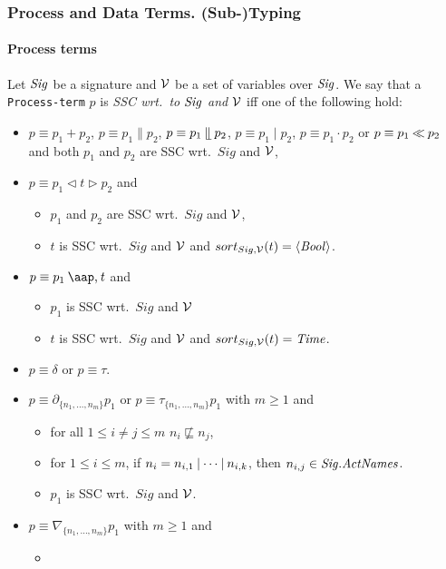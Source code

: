 \documentclass[fleqn,a4paper]{article}
\newcommand{\Sig}{\nm{Sig}}
\newcommand{\NV}{{\cal V}}
\begin{document}
\subsubsection{Process and Data Terms. (Sub-)Typing}

\paragraph{Process terms}
Let $\Sig$ be a signature and $\NV$ be a set of variables over $\Sig$.
We say that a {\tt Process-term} $p$ is {\it SSC wrt.\ to $\Sig$ and
$\NV$} iff one of the following hold:
\begin{itemize}
\item
  $p\equiv p_1+p_2$,
  $p\equiv p_1\parallel p_2$, $p\equiv p_1\mathbin{\mathrel{\llfloor}} p_2$, $p\equiv p_1\mid
  p_2$,
  $p\equiv p_1 {\cdot} p_2$ or $p\equiv p_1\mathbin{\ll} p_2$ and both $p_1$ and $p_2$ are SSC wrt.\ $Sig$ and $\NV$,
\item
  $p\equiv p_1\triangleleft t \triangleright p_2$ and
  \begin{itemize}
  \item
    $p_1$ and $p_2$ are SSC wrt.\ $Sig$ and $\NV$,
  \item
    $t$ is SSC wrt.\ $Sig$ and $\NV$ and $sort_{Sig,\NV}(t)=\seq{\Bool}$.
  \end{itemize}
\item
  $p\equiv p_1\at{t}$ and
  \begin{itemize}
\item
  $p_1$ is SSC wrt.\ $Sig$ and $\NV$
\item
  $t$ is SSC wrt.\ $Sig$ and $\NV$ and $sort_{Sig,\NV}(t)=\Time$.
\end{itemize}
\item
  $p\equiv \delta$ or $p\equiv\tau$.
\item
  $p\equiv\partial_{\{n_1,\ldots,n_m\}}p_1$ or
  $p\equiv \tau_{\{n_1,\ldots,n_m\}}p_1$ with $m\geq 1$ and
  \begin{itemize}
\item
  for all $1\leq i\neq j \leq m$ $n_i\not\sqsubseteq n_j$,
\item
  for $1\leq i\leq m$, if $n_i=n_{i,1}\comm\dots\comm n_{i,k}$, then $n_{i,j}\in \Sig.\nm{ActNames}$.
\item
  $p_1$ is SSC wrt.\ $Sig$ and $\NV$.
\end{itemize}
\item
  $p\equiv\nabla_{\{n_1,\ldots,n_m\}}p_1$ with $m\geq 1$ and
  \begin{itemize}
  \item

\end{itemize}
\end{itemize}
\end{document}
